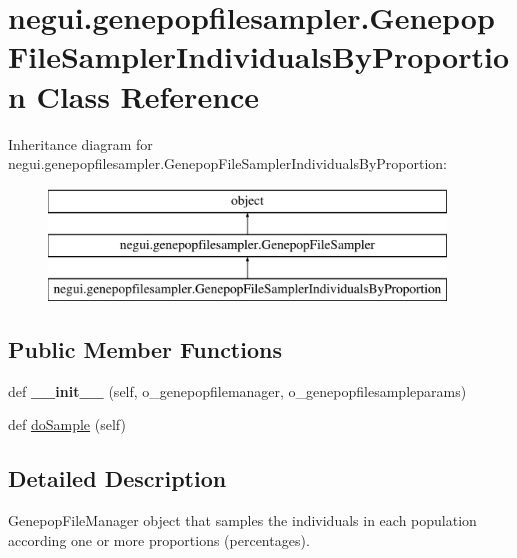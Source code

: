 \hypertarget{classnegui_1_1genepopfilesampler_1_1GenepopFileSamplerIndividualsByProportion}{}\section{negui.\+genepopfilesampler.\+Genepop\+File\+Sampler\+Individuals\+By\+Proportion Class Reference}
\label{classnegui_1_1genepopfilesampler_1_1GenepopFileSamplerIndividualsByProportion}
Inheritance diagram for negui.\+genepopfilesampler.\+Genepop\+File\+Sampler\+Individuals\+By\+Proportion\+:\begin{figure}[H]
\begin{center}
\leavevmode
\includegraphics[height=3.000000cm]{classnegui_1_1genepopfilesampler_1_1GenepopFileSamplerIndividualsByProportion}
\end{center}
\end{figure}
\subsection*{Public Member Functions}
\begin{DoxyCompactItemize}
\item 
def {\bfseries \+\_\+\+\_\+init\+\_\+\+\_\+} (self, o\+\_\+genepopfilemanager, o\+\_\+genepopfilesampleparams)\hypertarget{classnegui_1_1genepopfilesampler_1_1GenepopFileSamplerIndividualsByProportion_a1bc0babcecf6bbca34259328cae53b97}{}\label{classnegui_1_1genepopfilesampler_1_1GenepopFileSamplerIndividualsByProportion_a1bc0babcecf6bbca34259328cae53b97}

\item 
def \hyperlink{classnegui_1_1genepopfilesampler_1_1GenepopFileSamplerIndividualsByProportion_ad8170ea6661afa7bff72d484372209e3}{do\+Sample} (self)
\end{DoxyCompactItemize}


\subsection{Detailed Description}
\begin{DoxyVerb}GenepopFileManager object that samples the individuals in each population
according one or more proportions (percentages).
\end{DoxyVerb}
 

